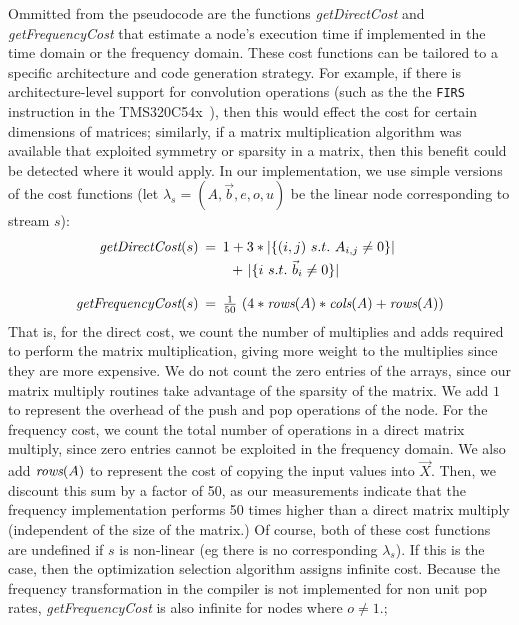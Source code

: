 Ommitted from the pseudocode are the functions {\it getDirectCost} 
and {\it getFrequencyCost} that estimate a node's
execution time if implemented in the time domain or the frequency
domain.  These cost functions can be tailored to a specific
architecture and code generation strategy.  For example, if there is
architecture-level support for convolution operations (such as 
the the {\tt FIRS} instruction in the TMS320C54x~\cite{ti-dsp-manual}), 
then this would effect the cost for certain dimensions of matrices; similarly, if a
matrix multiplication algorithm was available that exploited symmetry
or sparsity in a matrix, then this benefit could be detected where it
would apply.  In our implementation, we use simple versions of the
cost functions (let $\lambda_s=(A,\vec{b},e,o,u)$ be the linear node
corresponding to stream $s$):
\[
\begin{array}{rcl}
\mt{getDirectCost}(s) \hspace{-6pt} & = \hspace{-6pt} & 1 + 3 * |\{ (i,j)~s.t.~A_{i,j} \ne 0\}| \vspace{3pt} \\ 
 ~ & ~ & \hspace{6.8pt}+~|\{ i~s.t.~{\vec b}_i \ne 0 \}| \\ ~ & ~ & ~ \\
\mt{getFrequencyCost}(s)  \hspace{-6pt} & = \hspace{-6pt} & \frac{1}{50}~(4 * \mt{rows}(A) * \mt{cols}(A) + \mt{rows}(A))
\end{array}
\]
That is, for the direct cost, we count the number of multiplies and
adds required to perform the matrix multiplication, giving more weight
to the multiplies since they are more expensive.  We do not count the
zero entries of the arrays, since our matrix multiply routines take
advantage of the sparsity of the matrix.  We add $1$ to represent
the overhead of the push and pop operations of the node.  For the
frequency cost, we count the total number of operations in a direct
matrix multiply, since zero entries cannot be exploited in the
frequency domain.  We also add $\mbox{\it rows}(A)$ to represent the 
cost of copying the input values into $\vec{X}$. Then, we discount this sum
by a factor of 50, as our measurements indicate that the frequency
implementation performs 50 times higher than a direct matrix multiply
(independent of the size of the matrix.)  Of course, both of these
cost functions are undefined if $s$ is non-linear (eg there is no
corresponding $\lambda_s$). If this is the case, then
the optimization selection algorithm assigns infinite cost.
Because the frequency transformation in the compiler is not implemented for
non unit pop rates, {\it getFrequencyCost} is also infinite 
for nodes where $o \ne 1$.; 


